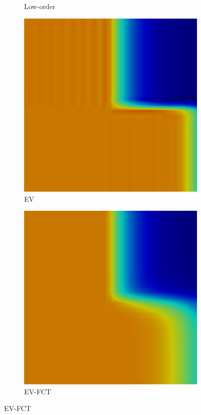 \documentclass{beamer}
\begin{document}
\begin{frame}
\begin{figure}[h]
\begin{subfigure}{0.3\textwidth}
      \caption{Low-order}
   \end{subfigure}
   \begin{subfigure}{0.3\textwidth}
      \includegraphics[width=\textwidth]{./figures/EV.png}
      \caption{EV}
   \end{subfigure}
   \begin{subfigure}{0.3\textwidth}
      \includegraphics[width=\textwidth]{./figures/EVFCT.png}
      \caption{EV-FCT}
   \end{subfigure}
\end{figure}

\end{frame}
\end{document}

